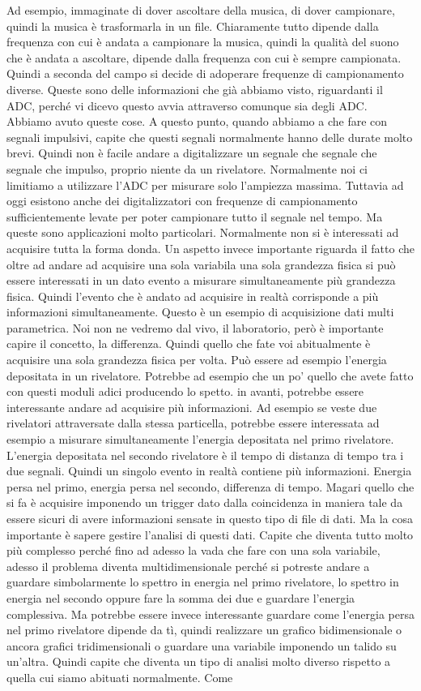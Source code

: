 Ad esempio, immaginate di dover ascoltare della musica, di dover campionare, quindi la musica è trasformarla in un file. Chiaramente tutto dipende dalla frequenza con cui è andata a campionare la musica, quindi la qualità del suono che è andata a ascoltare, dipende dalla frequenza con cui è sempre campionata. Quindi a seconda del campo si decide di adoperare frequenze di campionamento diverse. Queste sono delle informazioni che già abbiamo visto, riguardanti il ADC, perché vi dicevo questo avvia attraverso comunque sia degli ADC. Abbiamo avuto queste cose. A questo punto, quando abbiamo a che fare con segnali impulsivi, capite che questi segnali normalmente hanno delle durate molto brevi. Quindi non è facile andare a digitalizzare un segnale che segnale che segnale che impulso, proprio niente da un rivelatore. Normalmente noi ci limitiamo a utilizzare l'ADC per misurare solo l'ampiezza massima. Tuttavia ad oggi esistono anche dei digitalizzatori con frequenze di campionamento sufficientemente levate per poter campionare tutto il segnale nel tempo. Ma queste sono applicazioni molto particolari. Normalmente non si è interessati ad acquisire tutta la forma donda. Un aspetto invece importante riguarda il fatto che oltre ad andare ad acquisire una sola variabila una sola grandezza fisica si può essere interessati in un dato evento a misurare simultaneamente più grandezza fisica. Quindi l'evento che è andato ad acquisire in realtà corrisponde a più informazioni simultaneamente. Questo è un esempio di acquisizione dati multi parametrica. Noi non ne vedremo dal vivo, il laboratorio, però è importante capire il concetto, la differenza. Quindi quello che fate voi abitualmente è acquisire una sola grandezza fisica per volta. Può essere ad esempio l'energia depositata in un rivelatore. Potrebbe ad esempio che un po' quello che avete fatto con questi moduli adici producendo lo spetto. in avanti, potrebbe essere interessante andare ad acquisire più informazioni. Ad esempio se veste due rivelatori attraversate dalla stessa particella, potrebbe essere interessata ad esempio a misurare simultaneamente l'energia depositata nel primo rivelatore. L'energia depositata nel secondo rivelatore è il tempo di distanza di tempo tra i due segnali. Quindi un singolo evento in realtà contiene più informazioni. Energia persa nel primo, energia persa nel secondo, differenza di tempo. Magari quello che si fa è acquisire imponendo un trigger dato dalla coincidenza in maniera tale da essere sicuri di avere informazioni sensate in questo tipo di file di dati. Ma la cosa importante è sapere gestire l'analisi di questi dati. Capite che diventa tutto molto più complesso perché fino ad adesso la vada che fare con una sola variabile, adesso il problema diventa multidimensionale perché si potreste andare a guardare simbolarmente lo spettro in energia nel primo rivelatore, lo spettro in energia nel secondo oppure fare la somma dei due e guardare l'energia complessiva. Ma potrebbe essere invece interessante guardare come l'energia persa nel primo rivelatore dipende da tì, quindi realizzare un grafico bidimensionale o ancora grafici tridimensionali o guardare una variabile imponendo un talido su un'altra. Quindi capite che diventa un tipo di analisi molto diverso rispetto a quella cui siamo abituati normalmente. Come 